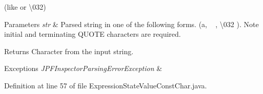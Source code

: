 (like  or \textbackslash{}032)


\begin{DoxyParams}{Parameters}
{\em str} & Parsed string in one of the following forms. (\textquotesingle{}a\textquotesingle{}, \textquotesingle{}~\newline
\textquotesingle{}, \textquotesingle{}\textbackslash{}032\textquotesingle{} \textquotesingle{}\textquotesingle{}). Note initial and terminating Q\+U\+O\+TE characters are required. \\
\hline
\end{DoxyParams}
\begin{DoxyReturn}{Returns}
Character from the input string.
\end{DoxyReturn}

\begin{DoxyExceptions}{Exceptions}
{\em J\+P\+F\+Inspector\+Parsing\+Error\+Exception} & \\
\hline
\end{DoxyExceptions}


Definition at line 57 of file Expression\+State\+Value\+Const\+Char.\+java.


